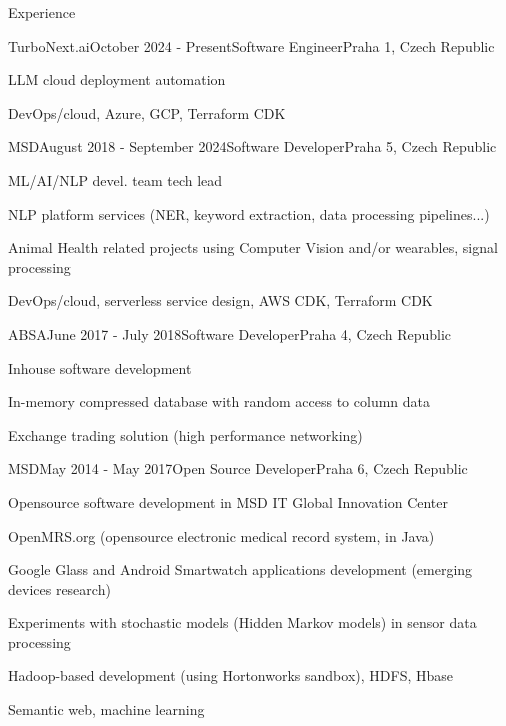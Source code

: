 \documentclass{resume} %
\begin{document}
\begin{rSection}{Experience}

\begin{rSubsection}{TurboNext.ai}{October 2024 - Present}{Software Engineer}{Praha 1, Czech Republic}
\item LLM cloud deployment automation
\item DevOps/cloud, Azure, GCP, Terraform CDK
\end{rSubsection}


\begin{rSubsection}{MSD}{August 2018 - September 2024}{Software Developer}{Praha 5, Czech Republic}
\item ML/AI/NLP devel. team tech lead
\item NLP platform services (NER, keyword extraction, data processing pipelines...)
\item Animal Health related projects using Computer Vision and/or wearables, signal processing
\item DevOps/cloud, serverless service design, AWS CDK, Terraform CDK
\end{rSubsection}


\begin{rSubsection}{ABSA}{June 2017 - July 2018}{Software Developer}{Praha 4, Czech Republic}
\item Inhouse software development
\item In-memory compressed database with random access to column data
\item Exchange trading solution (high performance networking)
\end{rSubsection}


\begin{rSubsection}{MSD}{May 2014 - May 2017}{Open Source Developer}{Praha 6, Czech Republic}
\item Opensource software development in MSD IT Global Innovation Center
\item OpenMRS.org (opensource electronic medical record system, in Java)
\item Google Glass and Android Smartwatch applications development (emerging devices research)
\item Experiments with stochastic models (Hidden Markov models) in sensor data processing
\item Hadoop-based development (using Hortonworks sandbox), HDFS, Hbase
\item Semantic web, machine learning
\end{rSubsection}


\end{rSection}
\end{document}
